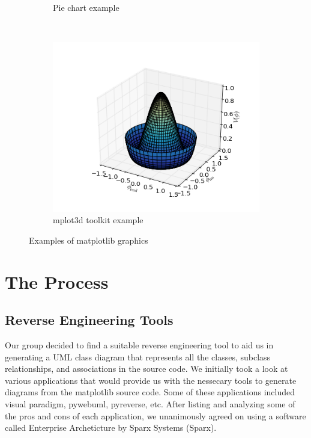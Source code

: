 \documentclass[pdftex,10pt,a4paper]{report}
\begin{document}
\begin{figure}
\begin{subfigure}[b]{0.3\textwidth}
                \caption{Pie chart example}
                \label{fig:pie}
        \end{subfigure}
        ~ %
        \begin{subfigure}[b]{0.3\textwidth}
                \includegraphics[width=\textwidth]{img/examples/mplot3d}
                \caption{mplot3d toolkit example}
                \label{fig:mplot3d}
        \end{subfigure}
        \caption{Examples of matplotlib graphics}\label{fig:examples}
\end{figure}




\chapter{The Process}

\section{Reverse Engineering Tools}

Our group decided to find a suitable reverse engineering tool to aid us in generating a UML class diagram that represents all the classes, subclass relationships, and associations in the source code. We initially took a look at various applications that would provide us with the nessecary tools to generate diagrams from the matplotlib source code. Some of these applications included visual paradigm, pywebuml, pyreverse, etc. After listing and analyzing some of the pros and cons of each application, we unanimously agreed on using a software called Enterprise Archeticture by Sparx Systems (Sparx). 
\end{document}
